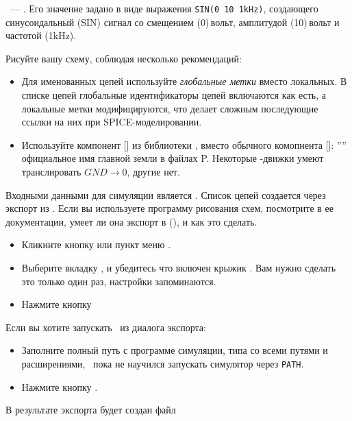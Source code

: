 \ --- . Его значение задано в
виде выражения \verb|SIN(0 10 1kHz)|, создающего синусоидальный (SIN) сигнал со
смещением (0)\,вольт, амплитудой (10)\,вольт и частотой (1kHz).

\bigskip
Рисуйте вашу схему, соблюдая несколько рекомендаций:  
\begin{itemize}
  \item
Для именованных цепей используйте \emph{глобальные метки} вместо локальных. 
В списке цепей глобальные идентификаторы цепей включаются как есть, а
локальные метки модифицируются, что делает сложным последующие ссылки на них при
SPICE-моделировании.
  \item
Используйте компонент [] из библиотеки , вместо обычного
комопнента []: ”” официальное имя главной земли в файлах
P\spice. Некоторые \spice-движки умеют транслировать $GND \rightarrow 0$, другие
нет.
\end{itemize}


Входными данными для симуляции является . 
Список цепей создается через экспорт из \eeschema. Если
вы используете программу рисования схем, посмотрите в ее документации, умеет ли
она экспорт в \spice (), и как это сделать.

\begin{itemize}
  \item
Кликните кнопку или пункт меню .
  \item
Выберите вкладку , и убедитесь что включен крыжик . Вам нужно сделать это только один раз, настройки
запоминаются.
\item 
Нажмите кнопку 
\end{itemize}

Если вы хотите запускать \ngs\ из диалога экспорта: 
\begin{itemize}
  \item
Заполните полный путь с программе симуляции, типа
 со всеми путями и расширениями, \kicad\ пока не
научился запускать симулятор через \verb|PATH|.
  \item
Нажмите кнопку .
\end{itemize}

\bigskip
В результате экспорта будет создан файл

